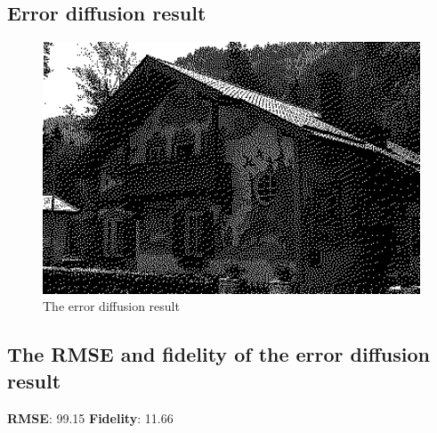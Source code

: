 \documentclass{article}
\begin{document}
\subsection{Error diffusion result}
\begin{figure}[H]
    \centering
    \includegraphics[width=1\textwidth]{../5-diffusion-result.png}
    \caption{The error diffusion result}
\end{figure}
\subsection{The RMSE and fidelity of the error diffusion result}
\textbf{RMSE}: 99.15
\textbf{Fidelity}: 11.66
\end{document}
